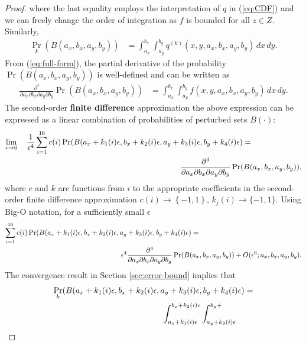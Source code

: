\begin{proof}
  where the last equality employs the interpretation of $q$ in
  (\ref{eq:CDF}) and we can freely change the order of integration as
  $f$ is bounded for all $z \in Z$. Similarly,
  \begin{align*}
    \Pr_k(B(a_x, b_x, a_y, b_y)) &= \displaystyle \int_{a_x}^{b_x} \displaystyle \int_{a_y}^{b_y} q^{(k)}(x,y,a_x,b_x,a_y,b_y)\, dx\, dy.
  \end{align*}
  From (\ref{eq:full-form}), the partial derivative of the probability
  $\Pr(B(a_x,b_x,a_y,b_y))$ is well-defined and can be written as
  \begin{align*}
    \frac{\partial^4}{\partial a_x \partial b_x \partial a_y \partial b_y} \Pr(B(a_x, b_x, a_y, b_y)) &= \displaystyle \int_{a_x}^{b_x} \displaystyle \int_{a_y}^{b_y} f(x,y,a_x,b_x,a_y,b_y)\, dx\, dy.
  \end{align*}
  The second-order \textbf{finite difference} approximation the above
  expression can be expressed as a linear combination of probabilities
  of perturbed sets $B(\cdot)$:
  \begin{align*}
    \lim_{\epsilon \to 0}\quad \frac{1}{\epsilon^4} \sum_{i=1}^{16} c(i) \Pr(B(a_x + k_1(i)\epsilon, b_x + k_2(i)\epsilon, a_y + k_3(i)\epsilon, b_y + k_4(i)\epsilon) &= \\
    \MoveEqLeft[8] \frac{\partial^4}{\partial a_x \partial b_x \partial a_y \partial b_y} \Pr(B(a_x, b_x, a_y, b_y)),
  \end{align*}
  where $c$ and $k$ are functions from $i$ to the appropriate
  coefficients in the second-order finite difference approximation
  $c(i) \to \left\{-1, 1\right\}$, $k_j(i) \to \{-1,1\}$. Using Big-O
  notation, for a sufficiently small $\epsilon$
  \begin{align}
    \sum_{i=1}^{16} c(i) \Pr(B(a_x + k_1(i)\epsilon, b_x +
    k_2(i)\epsilon, a_y + k_3(i)\epsilon, b_y + k_4(i)\epsilon) &= \nonumber \\
    \MoveEqLeft[10] \epsilon^4 \frac{\partial^4}{\partial a_x \partial b_x \partial
      a_y \partial b_y} \Pr(B(a_x, b_x, a_y, b_y)) + O(\epsilon^6 ;
    a_x, b_x, a_y, b_y). \label{eq:fin-diff}
  \end{align}
  The convergence result in Section \ref{sec:error-bound} implies that
  \begin{align*}
    \Pr_k(B(a_x + k_1(i)\epsilon, b_x + k_2(i)\epsilon, a_y +
    k_3(i)\epsilon, b_y + k_4(i)\epsilon) &= \\
    \MoveEqLeft[10] \displaystyle \int_{a_x +
    k_1(i)\epsilon}^{b_x + k_2(i)\epsilon} \displaystyle \int_{a_y + k_3(i)\epsilon}^{b_y +
}
\end{align*}
\end{proof}
